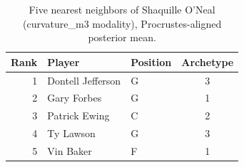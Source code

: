 \begin{table}[htbp]
  \centering\small
  \begin{tabular}{rllc}
    \toprule
    Rank & Player & Position & Archetype \\
    \midrule
    1 & Dontell Jefferson & G & 3 \\
    2 & Gary Forbes & G & 1 \\
    3 & Patrick Ewing & C & 2 \\
    4 & Ty Lawson & G & 3 \\
    5 & Vin Baker & F & 1 \\
    \bottomrule
  \end{tabular}
  \caption{Five nearest neighbors of Shaquille O'Neal (curvature_m3 modality), Procrustes-aligned posterior mean.}
  \label{tab:Shaquille_O_Neal_neighbors_curvature_m3}
\end{table}

